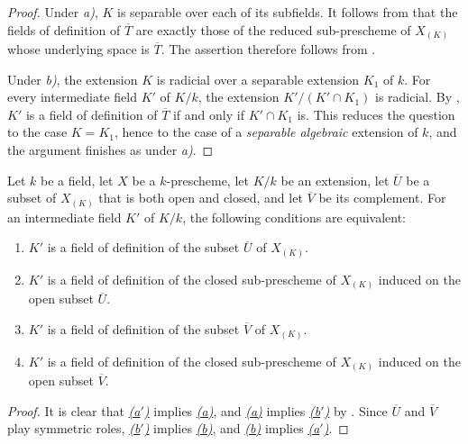 \begin{proof}
Under \emph{a)}, $K$ is separable over each of its
subfields.
It follows from  that the fields of definition of
$\overline T$ are exactly those of the reduced sub-prescheme of
$X_{(K)}$ whose underlying space is $\overline T$.
The assertion therefore follows from .

Under \emph{b)}, the extension $K$ is radicial over a
separable extension $K_1$ of $k$.
For every intermediate field $K'$ of $K/k$, the extension
$K'/(K'\cap K_1)$ is radicial.
By , $K'$ is a field of definition of
$\overline T$ if and only if $K'\cap K_1$ is.
This reduces the question to the case $K=K_1$, hence to the case of
a \emph{separable algebraic} extension of $k$, and the argument finishes as
under \emph{a)}.
\end{proof}

\begin{proposition}[4.9.6]
\label{IV.4.9.6}
Let $k$ be a field, let $X$ be a $k$-prescheme, let $K/k$ be an
extension, let $\overline U$ be a subset of $X_{(K)}$ that is both
open and closed, and let $\overline V$ be its complement.
For an intermediate field $K'$ of $K/k$, the following conditions
are equivalent:
\begin{enumerate}
\item[\rm(a)]
\label{IV.4.9.6.a}
$K'$ is a field of definition of the subset $\overline U$ of
$X_{(K)}$.
\item[\rm(a$'$)]
\label{IV.4.9.6.aprime}
$K'$ is a field of definition of the closed sub-prescheme of
$X_{(K)}$ induced on the open subset $\overline U$.
\item[\rm(b)]
\label{IV.4.9.6.b}
$K'$ is a field of definition of the subset $\overline V$ of
$X_{(K)}$.
\item[\rm(b$'$)]
\label{IV.4.9.6.bprime}
$K'$ is a field of definition of the closed sub-prescheme of
$X_{(K)}$ induced on the open subset $\overline V$.
\end{enumerate}
\end{proposition}

\begin{proof}
It is clear that
{\hyperref[IV.4.9.6.aprime]{\emph{(a$'$)}}} implies
{\hyperref[IV.4.9.6.a]{\emph{(a)}}}, and
{\hyperref[IV.4.9.6.a]{\emph{(a)}}} implies
{\hyperref[IV.4.9.6.bprime]{\emph{(b$'$)}}} by .
Since $\overline U$ and $\overline V$ play symmetric roles,
{\hyperref[IV.4.9.6.bprime]{\emph{(b$'$)}}} implies
{\hyperref[IV.4.9.6.b]{\emph{(b)}}}, and
{\hyperref[IV.4.9.6.b]{\emph{(b)}}} implies
{\hyperref[IV.4.9.6.aprime]{\emph{(a$'$)}}}.
\end{proof}

